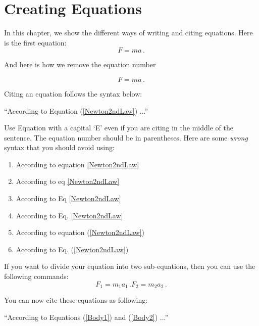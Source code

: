 \chapter{Creating Equations}\label{Chap1_Equations}

In this chapter, we show the different ways of writing and citing equations. Here is the first equation:
\color{black}
\begin{equation}
	\label{Newton2ndLaw}
	F = ma \,. 
\end{equation} 

And here is how we remove the equation number

\begin{equation*}
	\label{Newton2ndLaw}
	F = ma \,. 
\end{equation*} 



\color{blue}
Citing an equation follows the syntax below:

``According to Equation (\ref{Newton2ndLaw}) ...''

\noindent Use Equation with a capital `E' even if you are citing in the middle of the sentence. The equation number should be in parentheses.
\color{red}
 Here are some \textit{wrong} syntax that you should avoid using: 

	\begin{singlespace}
\color{red}
\begin{enumerate}
	\item According to equation \ref{Newton2ndLaw}
	\item According to eq \ref{Newton2ndLaw}
	\item According to Eq \ref{Newton2ndLaw}
	\item According to Eq. \ref{Newton2ndLaw}
	\item According to equation (\ref{Newton2ndLaw})
	\item According to Eq. (\ref{Newton2ndLaw})
\end{enumerate}
 \color{black}

\end{singlespace}


\color{black}
If you want to divide your equation into two sub-equations, then you can use the following commands: 
\begin{subequations}
	\begin{equation}
		\label{Body1}
	F_{1} = m_{1}a_{1} \,. 
	\end{equation}
	\begin{equation}
		\label{Body2}
	F_{2} = m_{2}a_{2} \,.  
	\end{equation}
\end{subequations}



You can now cite these equations as following: 

\color{blue} ``According to Equations (\ref{Body1}) and (\ref{Body2}) ...''\color{black}

